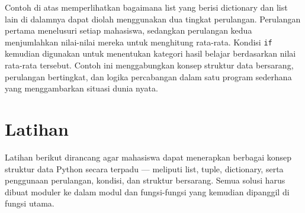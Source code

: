 Contoh di atas memperlihatkan bagaimana list yang berisi dictionary dan list lain di dalamnya dapat diolah menggunakan dua tingkat perulangan. 
Perulangan pertama menelusuri setiap mahasiswa, sedangkan perulangan kedua menjumlahkan nilai-nilai mereka untuk menghitung rata-rata. 
Kondisi \texttt{if} kemudian digunakan untuk menentukan kategori hasil belajar berdasarkan nilai rata-rata tersebut. 
Contoh ini menggabungkan konsep struktur data bersarang, perulangan bertingkat, dan logika percabangan dalam satu program sederhana yang menggambarkan situasi dunia nyata.

\section{Latihan}
Latihan berikut dirancang agar mahasiswa dapat menerapkan berbagai konsep struktur data Python 
secara terpadu — meliputi list, tuple, dictionary, serta penggunaan perulangan, kondisi, dan struktur bersarang. Semua solusi harus dibuat moduler ke dalam modul dan fungsi-fungsi yang kemudian dipanggil di fungsi utama. 

